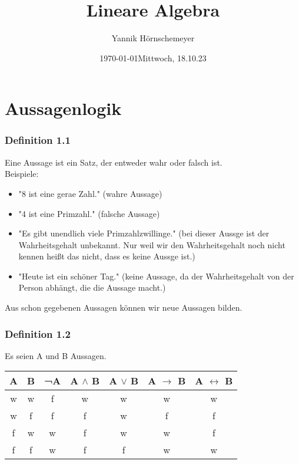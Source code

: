 \documentclass{article}
\title{Lineare Algebra}
\author{Yannik Hörnschemeyer}
\date{\today}
\begin{document}
\maketitle

\date{Mittwoch, 18.10.23}

\section{Aussagenlogik}
\subsubsection*{Definition 1.1} Eine Aussage ist ein Satz, der entweder wahr oder falsch ist.\\
Beispiele:
\begin{itemize}
    \item "8 ist eine gerae Zahl." (wahre Aussage)
    \item "4 ist eine Primzahl." (falsche Aussage)
    \item "Es gibt unendlich viele Primzahlzwillinge." (bei dieser Aussge ist der Wahrheitsgehalt unbekannt. Nur weil wir den Wahrheitsgehalt noch nicht kennen heißt das nicht, dass es keine Aussge ist.)
    \item "Heute ist ein schöner Tag." (keine Aussage, da der Wahrheitsgehalt von der Person abhängt, die die Aussage macht.)
\end{itemize}

Aus schon gegebenen Aussagen können wir neue Aussagen bilden.\\
\subsubsection*{Definition 1.2}
Es seien A und B Aussagen. 

\begin{center}
    \begin{tabular}{|c|c|c|c|c|c|c|}
        \hline
        A & B & ¬A & A $\wedge$ B & A $\vee$ B & A $\rightarrow$ B & A $\leftrightarrow$ B \\
        \hline
        \hline
        w & w & f & w & w & w & w \\
        w & f & f & f & w & f & f \\
        f & w & w & f & w & w & f \\
        f & f & w & f & f & w & w \\
        \hline
    \end{tabular}
\end{center}
\end{document}
